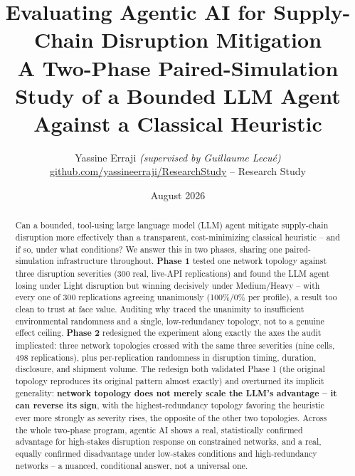\documentclass[10pt,twocolumn]{article}
\title{\vspace{-1.2em}\textbf{Evaluating Agentic AI for Supply-Chain Disruption Mitigation}\\
\large A Two-Phase Paired-Simulation Study of a Bounded LLM Agent Against a Classical Heuristic}
\author{\small Yassine Erraji \textit{(supervised by Guillaume Lecu\'e)} \\[-2pt] \small \href{https://github.com/yassineerraji/ResearchStudy}{github.com/yassineerraji/ResearchStudy} -- Research Study}
\date{\small August 2026}
\begin{document}
\maketitle
\vspace{-1.8em}

\begin{abstract}
\noindent Can a bounded, tool-using large language model (LLM) agent mitigate supply-chain disruption more effectively than a transparent, cost-minimizing classical heuristic -- and if so, under what conditions? We answer this in two phases, sharing one paired-simulation infrastructure throughout. \textbf{Phase 1} tested one network topology against three disruption severities (300 real, live-API replications) and found the LLM agent losing under Light disruption but winning decisively under Medium/Heavy -- with every one of 300 replications agreeing unanimously (100\%/0\% per profile), a result too clean to trust at face value. Auditing why traced the unanimity to insufficient environmental randomness and a single, low-redundancy topology, not to a genuine effect ceiling. \textbf{Phase 2} redesigned the experiment along exactly the axes the audit implicated: three network topologies crossed with the same three severities (nine cells, 498 replications), plus per-replication randomness in disruption timing, duration, disclosure, and shipment volume. The redesign both validated Phase 1 (the original topology reproduces its original pattern almost exactly) and overturned its implicit generality: \textbf{network topology does not merely scale the LLM's advantage -- it can reverse its sign}, with the highest-redundancy topology favoring the heuristic ever more strongly as severity rises, the opposite of the other two topologies. Across the whole two-phase program, agentic AI shows a real, statistically confirmed advantage for high-stakes disruption response on constrained networks, and a real, equally confirmed disadvantage under low-stakes conditions and high-redundancy networks -- a nuanced, conditional answer, not a universal one.
\end{abstract}
\end{document}
